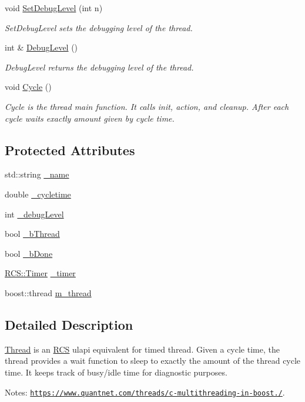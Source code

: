 \begin{DoxyCompactItemize}
void \hyperlink{classRCS_1_1Thread_a4bb0d136529374782030bf1bd19cad6d}{Set\-Debug\-Level} (int n)
\begin{DoxyCompactList}\small\item\em Set\-Debug\-Level sets the debugging level of the thread. \end{DoxyCompactList}\item 
int \& \hyperlink{classRCS_1_1Thread_abe304b8316eb45e0b01c1104376fbc41}{Debug\-Level} ()
\begin{DoxyCompactList}\small\item\em Debug\-Level returns the debugging level of the thread. \end{DoxyCompactList}\item 
void \hyperlink{classRCS_1_1Thread_a12ff1372b891db600b094d628e606045}{Cycle} ()
\begin{DoxyCompactList}\small\item\em Cycle is the thread main function. It calls init, action, and cleanup. After each cycle waits exactly amount given by cycle time. \end{DoxyCompactList}\end{DoxyCompactItemize}
\subsection*{Protected Attributes}
\begin{DoxyCompactItemize}
\item 
std\-::string \hyperlink{classRCS_1_1Thread_a665a238614304950e1c19e7d03e236e1}{\-\_\-name}
\item 
double \hyperlink{classRCS_1_1Thread_ae0fa1f2cd2d13eaad9ecb2c649cb6158}{\-\_\-cycletime}
\item 
int \hyperlink{classRCS_1_1Thread_a33e768da1acf4a1deec407edeb656dc2}{\-\_\-debug\-Level}
\item 
bool \hyperlink{classRCS_1_1Thread_acf46e3695b682bf24b8c80d0316edd82}{\-\_\-b\-Thread}
\item 
bool \hyperlink{classRCS_1_1Thread_acae3e9901f7de3fadd89fa67a30fabdf}{\-\_\-b\-Done}
\item 
\hyperlink{classRCS_1_1Timer}{R\-C\-S\-::\-Timer} \hyperlink{classRCS_1_1Thread_afddbc109781286f80017468dcccc6b10}{\-\_\-timer}
\item 
boost\-::thread \hyperlink{classRCS_1_1Thread_a06b98cfbb4d084f3776ad0ab8731a60a}{m\-\_\-thread}
\end{DoxyCompactItemize}


\subsection{Detailed Description}
\hyperlink{classRCS_1_1Thread}{Thread} is an \hyperlink{namespaceRCS}{R\-C\-S} ulapi equivalent for timed thread. Given a cycle time, the thread provides a wait function to sleep to exactly the amount of the thread cycle time. It keeps track of busy/idle time for diagnostic purposes. \par
 Notes\-: \href{https://www.quantnet.com/threads/c-multithreading-in-boost.10028/}{\tt https\-://www.\-quantnet.\-com/threads/c-\/multithreading-\/in-\/boost./}. 

